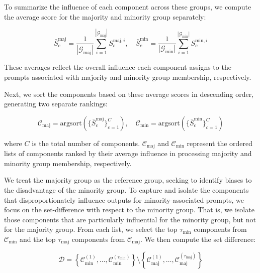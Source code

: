 To summarize the influence of each component across these groups, we compute the average score for the majority and minority group separately:

\begin{equation}
    \bar{S}_c^{\mathrm{maj}} = \frac{1}{|\mathcal{G}_{\mathrm{maj}}|} \sum_{i=1}^{|\mathcal{G}_{\mathrm{maj}}|} S_c^{\mathrm{maj}, i}, \quad \bar{S}_c^{\mathrm{min}} = \frac{1}{|\mathcal{G}_{\mathrm{min}}|} \sum_{i=1}^{|\mathcal{G}_{\mathrm{min}}|} S_c^{\mathrm{min}, i}
\end{equation}



These averages reflect the overall influence each component assigns to the prompts associated with majority and minority group membership, respectively.


Next, we sort the components based on these average scores in descending order, generating two separate rankings:

\begin{equation}
    \mathcal{C}_{\mathrm{maj}} = \mathrm{argsort}\left(\{\bar{S}_c^{\mathrm{maj}}\}_{c=1}^{C}\right), \quad \mathcal{C}_{\mathrm{min}} = \mathrm{argsort}\left(\{\bar{S}_c^{\mathrm{min}}\}_{c=1}^{C}\right)
\end{equation}


where $C$ is the total number of components. $\mathcal{C}_{\mathrm{maj}}$ and $\mathcal{C}_{\mathrm{min}}$ represent the ordered lists of components ranked by their average influence in processing majority and minority group membership, respectively.

We treat the majority group as the reference group, seeking to identify biases to the disadvantage of the minority group. To capture and isolate the components that disproportionately influence outputs for minority-associated prompts, we focus on the set-difference with respect to the minority group. That is, we isolate those components that are particularly influential for the minority group, but not for the majority group. From each list, we select the top $\tau_{\mathrm{min}}$ components from $\mathcal{C}_{\mathrm{min}}$ and the top $\tau_{\mathrm{maj}}$ components from $\mathcal{C}_{\mathrm{maj}}$. We then compute the set difference:



\begin{equation}
    \mathcal{D} = \left\{\mathcal{C}_{\mathrm{min}}^{(1)}, \dots, \mathcal{C}_{\mathrm{min}}^{(\tau_{\mathrm{min}})}\right\} \setminus \left\{\mathcal{C}_{\mathrm{maj}}^{(1)}, \dots, \mathcal{C}_{\mathrm{maj}}^{(\tau_{\mathrm{maj}})}\right\}
    \label{eq:set_diff}
\end{equation}

